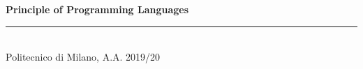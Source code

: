 




\raggedright
\footnotesize
\begin{multicols}{3}
\setlength{\premulticols}{1pt}
\setlength{\postmulticols}{1pt}
\setlength{\multicolsep}{1pt}
\setlength{\columnsep}{2pt}

{\Large{\textbf{Principle of Programming Languages}}}






\rule{0.3\linewidth}{0.25pt}
\scriptsize\\
Politecnico di Milano, A.A. 2019/20
\vfill\null 
\columnbreak
\vfill\null
\columnbreak
\vfill\null
\columnbreak
\end{multicols}
